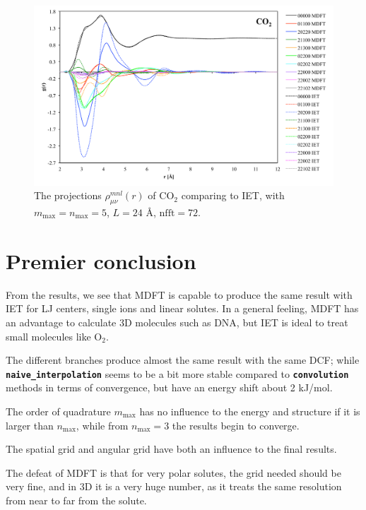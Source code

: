 \begin{figure}[h]
\begin{centering}
\includegraphics[width=1\columnwidth]{_figure/results/co2}
\par\end{centering}
\caption[The projections $\rho_{\mu\nu}^{mnl}(r)$ of $\mathrm{CO}_{2}$ comparing
to \acs{IET}]{The projections $\rho_{\mu\nu}^{mnl}(r)$ of $\mathrm{CO}_{2}$ comparing
to \acs{IET}, with $m_{\max}=n_{\max}=5$, $L=24$ $\textrm{Å}$,
$\mathrm{nfft}=72$.\label{fig:Comparison-co2}}
\end{figure}


\section{Premier conclusion}

From the results, we see that \acs{MDFT} is capable to produce the
same result with \acs{IET} for LJ centers, single ions and linear
solutes. In a general feeling, \acs{MDFT} has an advantage to calculate
3D molecules such as DNA, but \acs{IET} is ideal to treat small molecules
like $\mathrm{O}_{2}$.

The different branches produce almost the same result with the same
\acs{DCF}; while \texttt{\textbf{naive\_interpolation}} seems to
be a bit more stable compared to \texttt{\textbf{convolution}} methods
in terms of convergence, but have an energy shift about 2 kJ/mol.

The order of quadrature $m_{\max}$ has no influence to the energy
and structure if it is larger than $n_{\max}$, while from $n_{\max}=3$
the results begin to converge.

The spatial grid and angular grid have both an influence to the final
results.

The defeat of \acs{MDFT} is that for very polar solutes, the grid
needed should be very fine, and in 3D it is a very huge number, as
it treats the same resolution from near to far from the solute.
